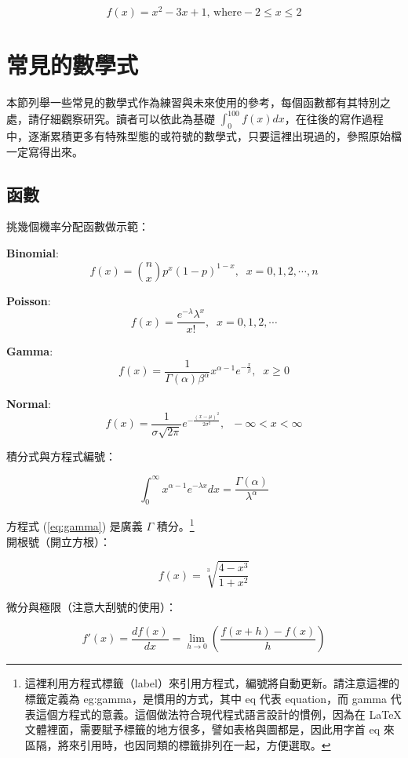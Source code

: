 \documentclass[12pt, a4paper]{article}
\begin{document}
$$f(x)=x^2-3x+1 \mbox{, where}  -2 \leq x \leq 2$$

\section{常見的數學式}
本節列舉一些常見的數學式作為練習與未來使用的參考，每個函數都有其特別之處，請仔細觀察研究。讀者可以依此為基礎 $\displaystyle\int_0^{100} f(x)dx$，在往後的寫作過程中，逐漸累積更多有特殊型態的或符號的數學式，只要這裡出現過的，參照原始檔一定寫得出來。


\subsection{函數}
挑幾個機率分配函數做示範：

\textbf{Binomial}: 
$$f(x)={n\choose x}p^x(1-p)^{1-x}, \;\; x=0,1,2,\cdots,n$$ 

\textbf{Poisson}: 
$$f(x)=\frac{e^{-\lambda}\lambda^x}{x!}, \;\;  x=0,1,2,\cdots$$ 

\textbf{Gamma}: 
$$f(x)=\frac{1}{\Gamma(\alpha)\beta^\alpha}x^{\alpha-1}e^{-\frac{x}{\beta}}, \;\; x\geq 0$$

\textbf{Normal}: 
$$f(x)=\frac{1}{\sigma\sqrt{2\pi}}e^{-\frac{(x-\mu)^2}{2\sigma^2}}, \;\;  -\infty < x < \infty $$

\bigskip
積分式與方程式編號：
  
  \begin{equation}\label{eq:gamma}%
  \int^\infty_0 x^{\alpha-1}e^{-\lambda x} dx = \frac{\Gamma(\alpha)}{\lambda^{\alpha}}
  \end{equation}

方程式  (\ref{eq:gamma}) 是廣義 $\Gamma$ 積分。\footnote{這裡利用方程式標籤（label）來引用方程式，編號將自動更新。請注意這裡的標籤定義為 eg:gamma，是慣用的方式，其中 eq 代表 equation，而 gamma 代表這個方程式的意義。這個做法符合現代程式語言設計的慣例，因為在 \LaTeX 文體裡面，需要賦予標籤的地方很多，譬如表格與圖都是，因此用字首 eq 來區隔，將來引用時，也因同類的標籤排列在一起，方便選取。}\\
  
 開根號（開立方根）：
  
  $$f(x)=\sqrt[3]{\frac {\displaystyle 4-x^{3}}{\displaystyle 1+x^{2}}}$$
  
 微分與極限（注意大刮號的使用）：
  
  $$f'(x)=\frac{df(x)}{dx}=\lim_{h\rightarrow 0}\left(\frac{f(x+h)-f(x)}{h}\right)$$
  
\end{document}
